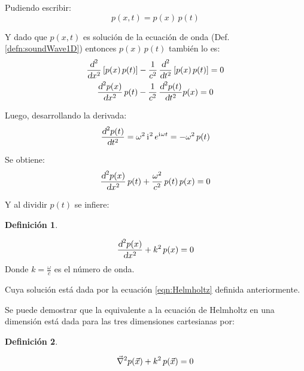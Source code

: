 \documentclass[a5paper,12pt,twoside]{book}
\newtheorem{defn}{{Definición}}[chapter]
\begin{document}
Pudiendo escribir:
\begin{equation*}
    p(x,t) = p(x) \, p(t)
\end{equation*}

Y dado que $p(x,t)$ es solución de la ecuación de onda (Def. \ref{defn:soundWave1D}) entonces $p(x) \, p(t)$ también lo es:
\begin{gather*}
    \frac{\textsl{d}^2}{\textsl{d} x^2} \left[ p(x) \, p(t) \right] - \frac{1}{c^2} \, \frac{\textsl{d}^2}{\textsl{d} t^2} \left[ p(x) \, p(t) \right] = 0
    \\
    \frac{\textsl{d}^2 p(x)}{\textsl{d} x^2} \, p(t) - \frac{1}{c^2} \, \frac{\textsl{d}^2 p(t)}{\textsl{d} t^2} p(x) = 0
\end{gather*}

Luego, desarrollando la derivada:
\begin{equation*}
    \frac{\textsl{d}^2 p(t)}{\textsl{d} t^2} = \omega^2 \, \mathrm{i}\mkern1mu^2 \, e^{\mathrm{i}\mkern1mu \omega t} = - \omega^2 \, p(t)
\end{equation*}

Se obtiene:
\begin{equation*}
    \frac{\textsl{d}^2 p(x)}{\textsl{d} x^2} \, p(t) + \frac{\omega^2}{c^2} \, p(t) \, p(x) = 0
\end{equation*}

Y al dividir $p(t)$ se infiere:

\begin{mdframed}[style=MyFrame1]
    \begin{defn}
        \label{defn:Helmholtz1D}
    \end{defn}
    \begin{equation*}
        \frac{\textsl{d}^2 p(x)}{\textsl{d} x^2} + k^2 \, p(x) = 0
    \end{equation*}
    Donde $k=\frac{\omega}{c}$ es el número de onda.
\end{mdframed}

Cuya solución está dada por la ecuación \ref{eqn:Helmholtz} definida anteriormente.

Se puede demostrar que la equivalente a la ecuación de Helmholtz en una dimensión está dada para las tres dimensiones cartesianas por:

\begin{mdframed}[style=MyFrame1]
    \begin{defn}
        \label{defn:Helmholtz3D}
    \end{defn}
    \begin{equation*}
        \Vec{\nabla}^2 p(\Vec{x}) + k^2 \, p(\Vec{x}) = 0
    \end{equation*}
\end{mdframed}
\end{document}
